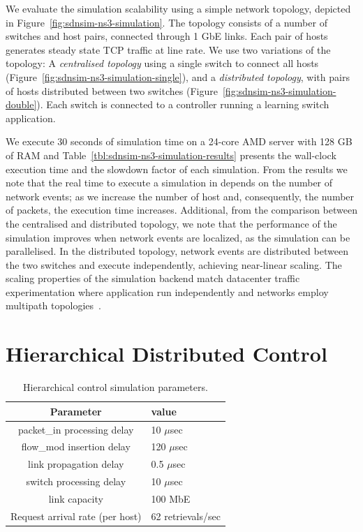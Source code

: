 We evaluate the \sdnsim simulation scalability using a simple network topology,
depicted in Figure~\ref{fig:sdnsim-ns3-simulation}.  The topology consists of a
number of switches and host pairs, connected through 1 GbE links.  Each pair of
hosts generates steady state TCP traffic at line rate.  We use two variations of
the topology: A \textit{centralised topology} \/using a single switch to connect
all hosts (Figure~\ref{fig:sdnsim-ns3-simulation-single}), and a
\textit{distributed topology}, with pairs of hosts distributed between two
switches (Figure~\ref{fig:sdnsim-ns3-simulation-double}).  Each switch is
connected to a controller running a learning switch application. 

We execute 30 seconds of simulation time on a 24-core AMD server with 128 GB of
RAM and Table~\ref{tbl:sdnsim-ns3-simulation-results} presents the wall-clock
execution time and the slowdown factor of each simulation.  From the results we
note that the real time to execute a simulation in \sdnsim depends on the number
of network events; as we increase the number of host and, consequently, the
number of packets, the execution time increases.  Additional, from the
comparison between the centralised and distributed topology, we note that the
performance of the simulation improves when network events are localized, as the
simulation can be parallelised. In the distributed topology, network events are
distributed between the two switches and execute independently, achieving
near-linear scaling. The scaling properties of the \sdnsim simulation backend
match datacenter traffic experimentation where application run
independently and networks employ multipath topologies~. 

\section{Hierarchical Distributed Control}\label{sec:rdsf-eval}

\begin{table}
\begin{center}
\begin{tabular}{|c| l |} \hline
  Parameter & value \\ \hline
  packet\_in processing delay & 10 $\mu$sec \\ \hline
  flow\_mod insertion delay & 120 $\mu$sec \\ \hline
  link propagation delay & 0.5 $\mu$sec \\ \hline
  switch processing delay & 10 $\mu$sec \\ \hline
  link capacity & 100 MbE \\ \hline
  Request arrival rate (per host) & 62 retrievals/sec \\ \hline
\end{tabular}
\end{center}
\label{tbl:sdnsim_experiment_parameters}
\caption{Hierarchical control simulation parameters.}
\end{table}

